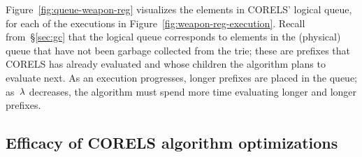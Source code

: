 Figure~\ref{fig:queue-weapon-reg} visualizes the elements in CORELS' logical queue,
for each of the executions in Figure~\ref{fig:weapon-reg-execution}.
%
Recall from~\S\ref{sec:gc} that the logical queue corresponds to elements in the
(physical) queue that have not been garbage collected from the trie; these are prefixes that
CORELS has already evaluated and whose children the algorithm plans to evaluate next.
%
As an execution progresses, longer prefixes are placed in the queue;
as~${\lambda}$ decreases, the algorithm must spend more time evaluating longer and longer prefixes.

\subsection{Efficacy of CORELS algorithm optimizations}
\label{sec:ablation}

